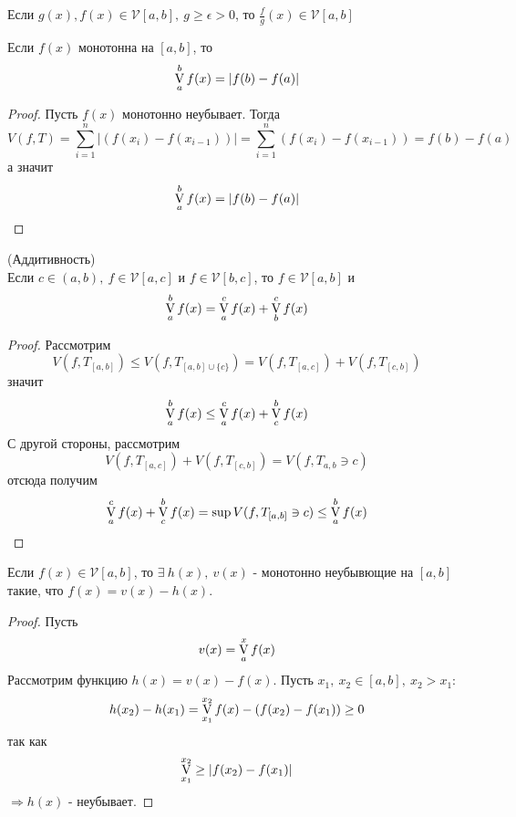 \begin{consequense}
    Если $g(x), f(x)\in \mathcal{V}[a,b],\ g\geq \epsilon>0$, то $\frac{f}{g}(x)\in \mathcal{V}[a,b]$
\end{consequense} 
\begin{numtheorem}
    Если $f(x)$ монотонна на $[a,b]$, то
    \[\operatorname*{V}\limits_{a}^{b} f(x)=|f(b)- f(a)|\]
\end{numtheorem}
\begin{proof}
    Пусть $f(x)$ монотонно неубывает. Тогда
    \[V(f,T)=\sum\limits_{i=1}^{n}|(f(x_i)-f(x_{i-1}))|=\sum\limits_{i=1}^{n}(f(x_i)-f(x_{i-1}))=f(b)-f(a)\]
    а значит
    \[\operatorname*{V}\limits_{a}^{b}f(x)=|f(b)-f(a)|\]
\end{proof} 
\begin{numtheorem} (Аддитивность)\\
    Если $c\in (a,b),\ f\in \mathcal{V}[a,c]$ и $f\in \mathcal{V}[b,c]$, то $f\in \mathcal{V}[a,b]$ и 
    \[\operatorname*{V}\limits_{a}^{b}f(x)=\operatorname*{V}\limits_{a}^{c}f(x)+\operatorname*{V}\limits_{b}^{c}f(x)\]
\end{numtheorem} 
\begin{proof}
    Рассмотрим 
    \[V(f,T_{[a,b]})\leq V(f, T_{[a,b]\cup \{c\}})=V(f, T_{[a,c]})+V(f,T_{[c,b]})\]
    значит
    \[\operatorname*{V}\limits_{a}^{b} f(x)\leq \operatorname*{V}\limits_{a}^{c} f(x)+\operatorname*{V}\limits_{c}^{b} f(x)\]
    С другой стороны, рассмотрим 
    \[V(f, T_{[a,c]})+V(f, T_{[c,b]})=V(f, T_{a,b}\ni c)\]
    отсюда получим
    \[\operatorname*{V}\limits_{a}^{c}f(x)+\operatorname*{V}\limits_{c}^{b}f(x)=\sup V(f,T_{[a,b]}\ni c)\leq \operatorname*{V}\limits_{a}^{b} f(x)\] 
\end{proof} 
\setcounter{thmcount}{0}
\begin{theorem}
    Если $f(x)\in \mathcal{V}[a,b]$, то $\exists\ h(x),\ v(x)$ - монотонно неубывющие на $[a,b]$ такие, что $f(x)=v(x)-h(x)$.
\end{theorem} 
\begin{proof}
    Пусть
    \[v(x)=\operatorname*{V}\limits_{a}^{x} f(x)\]
    Рассмотрим функцию $h(x)=v(x)-f(x)$. Пусть $x_1,\ x_2\in [a,b],\ x_2>x_1$:
    \[h(x_2)-h(x_1)=\operatorname*{V}\limits_{x_1}^{x_2}f(x)-(f(x_2)-f(x_1))\geq 0\]
    так как 
    \[\operatorname*{V}\limits_{x_1}^{x_2}\geq|f(x_2)-f(x_1)|\]
    $\Rightarrow h(x)$ - неубывает.
\end{proof} 
